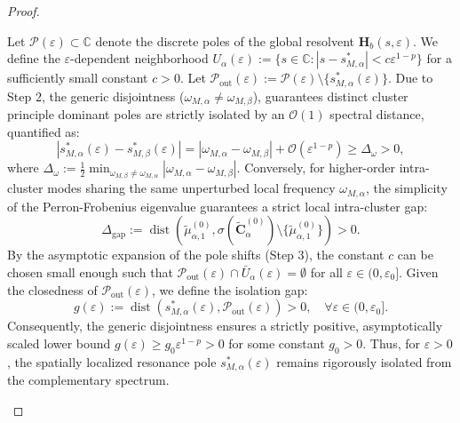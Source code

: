 \documentclass[11pt,a4paper]{article}
\numberwithin{equation}{section}
\begin{document}
\begin{proof}
\begin{enumerate}
\medskip
\noindent
Let $\mathcal{P}(\varepsilon) \subset \mathbb{C}$ denote the discrete poles of the global resolvent $\mathbf{H}_b(s, \varepsilon)$. We define the $\varepsilon$-dependent neighborhood $U_\alpha(\varepsilon) := \{s \in \mathbb{C} : |s - s^*_{M,\alpha}| < c\varepsilon^{1-p}\}$ for a sufficiently small constant $c>0$.
\newline
Let $\mathcal{P}_{\text{out}}(\varepsilon) := \mathcal{P}(\varepsilon) \setminus \{s_{M, \alpha}^\ast(\varepsilon)\}$. 
Due to Step 2, the generic disjointness ($\omega_{M,\alpha} \ne \omega_{M,\beta}$), guarantees distinct cluster principle dominant poles are strictly isolated by an $\mathcal{O}(1)$ spectral distance, quantified as:
\begin{equation}
    |s_{M,\alpha}^\ast(\varepsilon) - s_{M,\beta}^\ast(\varepsilon)| = |\omega_{M,\alpha} - \omega_{M,\beta}| + \mathcal{O}(\varepsilon^{1-p}) \ge \Delta_\omega > 0,
\end{equation}
where $\Delta_\omega := \frac{1}{2} \min_{\omega_{M,\beta} \neq \omega_{M,\alpha}} |\omega_{M,\alpha} - \omega_{M,\beta}|$.
\newline
Conversely, for higher-order intra-cluster modes sharing the same unperturbed local frequency $\omega_{M,\alpha}$, the simplicity of the Perron-Frobenius eigenvalue guarantees a strict local intra-cluster gap:
$$\Delta_{\text{gap}} := \operatorname{dist}\left(\widetilde{\mu}_{\alpha, 1}^{(0)}, \sigma(\widetilde{\mathbf{C}}_\alpha^{(0)}) \setminus \{\widetilde{\mu}_{\alpha, 1}^{(0)}\}\right) > 0.$$
\newline
By the asymptotic expansion of the pole shifts (Step 3), the constant $c$ can be chosen small enough such that $\mathcal{P}_{\text{out}}(\varepsilon) \cap \bar{U}_\alpha(\varepsilon) = \emptyset$ for all $\varepsilon \in (0, \varepsilon_0]$. Given the closedness of $\mathcal{P}_{\text{out}}(\varepsilon)$, we define the isolation gap:
\begin{equation}
    g(\varepsilon) := \operatorname{dist}(s_{M, \alpha}^\ast(\varepsilon), \mathcal{P}_{\text{out}}(\varepsilon)) > 0, \quad \forall \varepsilon \in (0, \varepsilon_0].
\end{equation}
Consequently, the generic disjointness ensures a strictly positive, asymptotically scaled lower bound $g(\varepsilon) \ge g_0 \varepsilon^{1-p} > 0$ for some constant $g_0 > 0$. Thus, for $\varepsilon>0$, the spatially localized resonance pole $s_{M, \alpha}^\ast(\varepsilon)$ remains rigorously isolated from the complementary spectrum.




\end{enumerate}
\end{proof}
\end{document}
